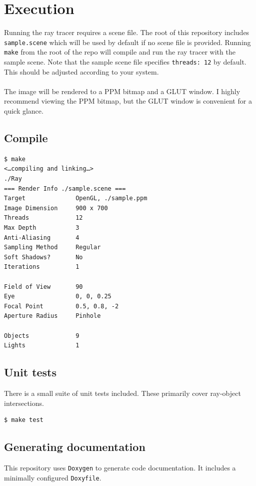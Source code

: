 \documentclass{article}
\begin{document}
\section{Execution}

Running the ray tracer requires a scene file.
The root of this repository includes \texttt{sample.scene} which will be used by default if no scene file is provided.
Running \texttt{make} from the root of the repo will compile and run the ray tracer with the sample scene.
Note that the sample scene file specifies \texttt{threads: 12} by default.
This should be adjusted according to your system.
\\\\
\noindent
The image will be rendered to a PPM bitmap and a GLUT window.
I highly recommend viewing the PPM bitmap, but the GLUT window is convenient for a quick glance.

\subsection{Compile}

\begin{verbatim}
$ make
<…compiling and linking…>
./Ray
=== Render Info ./sample.scene ===
Target              OpenGL, ./sample.ppm
Image Dimension     900 x 700
Threads             12
Max Depth           3
Anti-Aliasing       4
Sampling Method     Regular
Soft Shadows?       No
Iterations          1

Field of View       90
Eye                 0, 0, 0.25
Focal Point         0.5, 0.8, -2
Aperture Radius     Pinhole

Objects             9
Lights              1
\end{verbatim}

\subsection{Unit tests}

There is a small suite of unit tests included.
These primarily cover ray-object intersections.

\begin{verbatim}
$ make test
\end{verbatim}

\subsection{Generating documentation}

This repository uses \texttt{Doxygen} to generate code documentation.
It includes a minimally configured \texttt{Doxyfile}.
\end{document}
